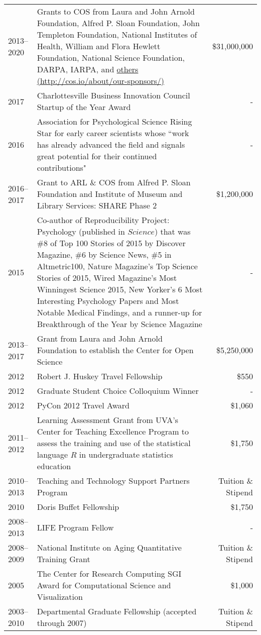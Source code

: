 \documentclass[11pt]{article}
\begin{document}
\begin{tabularx}{\textwidth}{lXr}
2013--2020 	& Grants to COS from Laura and John Arnold Foundation, Alfred P. Sloan Foundation, John Templeton Foundation, National Institutes of Health, William and Flora Hewlett Foundation, National Science Foundation, DARPA, IARPA, and \href{http://cos.io/about/our-sponsors/}{others (http://cos.io/about/our-sponsors/)} & \$31,000,000 \\
2017 			& Charlottesville Business Innovation Council Startup of the Year Award & - \\
2016			& Association for Psychological Science Rising Star for early career scientists whose ``work has already advanced the field and signals great potential for their continued contributions" & - \\
2016--2017		& Grant to ARL \& COS from Alfred P. Sloan Foundation and Institute of Museum and Library Services: SHARE Phase 2 & \$1,200,000 \\
2015 			& Co-author of Reproducibility Project: Psychology (published in $Science$) that was \#8 of Top 100 Stories of 2015 by Discover Magazine, \#6 by Science News, \#5 in Altmetric100, Nature Magazine’s Top Science Stories of 2015,  Wired Magazine’s Most Winningest Science 2015, New Yorker’s 6 Most Interesting Psychology Papers and Most Notable Medical Findings, and a runner-up for Breakthrough of the Year by Science Magazine & - \\
2013--2017  	& Grant from Laura and John Arnold Foundation to establish the Center for Open Science & \$5,250,000 \\
2012        		& Robert J. Huskey Travel Fellowship  & \$550 \\
2012        		& Graduate Student Choice Colloquium Winner  & - \\
2012        		& PyCon 2012 Travel Award & \$1,060\\
2011--2012  	& Learning Assessment Grant from UVA's Center for Teaching Excellence Program to assess the training and use of the statistical language $R$ in undergraduate statistics education & \$1,750\\
2010--2013		& Teaching and Technology Support Partners Program & Tuition \& Stipend \\
2010       		& Doris Buffet Fellowship & \$1,750 \\
2008--2013 	& LIFE Program Fellow & - \\
2008--2009  	& National Institute on Aging Quantitative Training Grant & Tuition \& Stipend \\
2005 				& The Center for Research Computing SGI Award for Computational Science and Visualization & \$1,000 \\
2003--2010  	& Departmental Graduate Fellowship (accepted through 2007)  & Tuition \& Stipend \\
\end{tabularx}
\end{document}
